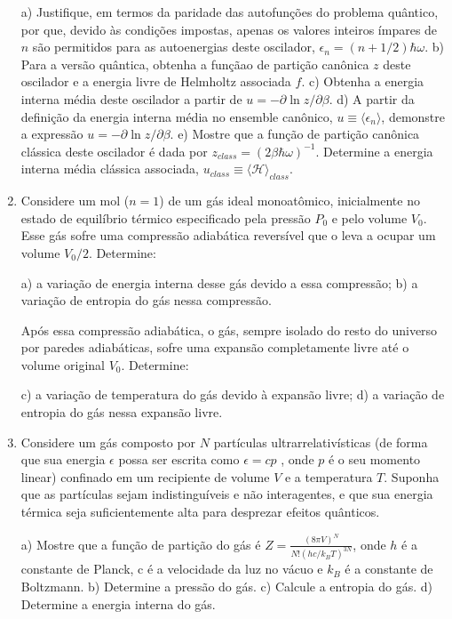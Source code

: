 \begin{enumerate}[start=1,label={\bfseries Q\arabic*.}]
a) Justifique, em termos da paridade das autofunções do problema quântico, por que, devido às condições impostas, apenas os valores inteiros ímpares de $n$ são permitidos para as autoenergias deste oscilador, $\epsilon_{n} = (n + 1/2)\hbar \omega$.
b) Para a versão quântica, obtenha a funçãao de partição canônica $z$ deste oscilador e a energia livre de Helmholtz associada $f$.
c) Obtenha a energia interna média deste oscilador a partir de $u = -\partial \operatorname{ln} z/ \partial \beta$.
d) A partir da definição da energia interna média no ensemble canônico, $u \equiv \langle \epsilon_{n} \rangle$, demonstre a expressão $u = -\partial \operatorname{ln}z / \partial \beta$.
e) Mostre que a função de partição canônica clássica deste oscilador é dada por $z_{class} = (2\beta \hbar \omega)^{-1}$. Determine a energia interna média clássica associada, $u_{class} \equiv \langle \mathscr{H} \rangle_{class}$.




\item Considere um mol ($n = 1$) de um gás ideal monoatômico, inicialmente no estado de equilíbrio térmico especificado pela pressão $P_{0}$ e pelo volume $V_{0}$. Esse gás sofre uma compressão adiabática reversível que o leva a ocupar um volume $V_{0}/2$. Determine:


a) a variação de energia interna desse gás devido a essa compressão;
b) a variação de entropia do gás nessa compressão.

Após essa compressão adiabática, o gás, sempre isolado do resto do universo por paredes adiabáticas, sofre uma expansão completamente livre até o volume original $V_{0}$. Determine:

c) a variação de temperatura do gás devido à expansão livre;
d) a variação de entropia do gás nessa expansão livre.





\item Considere um gás composto por $N$ partículas ultrarrelativísticas (de forma que sua energia $\epsilon$ possa ser escrita como $\epsilon = cp$ , onde $p$ é o seu momento linear) confinado em um recipiente de volume $V$ e a temperatura $T$. Suponha que as partículas sejam indistinguíveis e não interagentes, e que sua energia térmica seja suficientemente alta para desprezar efeitos quânticos.

a) Mostre que a função de partição do gás é $Z=\frac{(8 \pi V)^{N}}{N !\left(h c / k_{B} T\right)^{3 N}}$, onde $h$ é a constante de Planck, c é a velocidade da luz no vácuo e $k_{B}$ é a constante de Boltzmann.
b) Determine a pressão do gás.
c) Calcule a entropia do gás.
d) Determine a energia interna do gás.






\end{enumerate}
